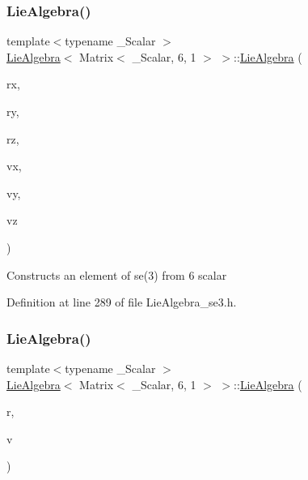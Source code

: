 \subsubsection{\texorpdfstring{Lie\+Algebra()}{LieAlgebra()}\hspace{0.1cm}{\footnotesize\ttfamily [4/5]}}
{\footnotesize\ttfamily template$<$typename \+\_\+\+Scalar $>$ \\
\hyperlink{class_lie_algebra}{Lie\+Algebra}$<$ Matrix$<$ \+\_\+\+Scalar, 6, 1 $>$ $>$\+::\hyperlink{class_lie_algebra}{Lie\+Algebra} (\begin{DoxyParamCaption}\item[{Scalar}]{rx,  }\item[{Scalar}]{ry,  }\item[{Scalar}]{rz,  }\item[{Scalar}]{vx,  }\item[{Scalar}]{vy,  }\item[{Scalar}]{vz }\end{DoxyParamCaption})\hspace{0.3cm}{\ttfamily [inline]}}

Constructs an element of se(3) from 6 scalar 

Definition at line 289 of file Lie\+Algebra\+\_\+se3.\+h.

\hypertarget{class_lie_algebra_3_01_matrix_3_01___scalar_00_016_00_011_01_4_01_4_a9cb95236184bdf617027d9c71fcbf66a}{}\label{class_lie_algebra_3_01_matrix_3_01___scalar_00_016_00_011_01_4_01_4_a9cb95236184bdf617027d9c71fcbf66a} 
\subsubsection{\texorpdfstring{Lie\+Algebra()}{LieAlgebra()}\hspace{0.1cm}{\footnotesize\ttfamily [5/5]}}
{\footnotesize\ttfamily template$<$typename \+\_\+\+Scalar $>$ \\
\hyperlink{class_lie_algebra}{Lie\+Algebra}$<$ Matrix$<$ \+\_\+\+Scalar, 6, 1 $>$ $>$\+::\hyperlink{class_lie_algebra}{Lie\+Algebra} (\begin{DoxyParamCaption}\item[{const typename Base\+::so3\+Element \&}]{r,  }\item[{const typename Base\+::\+Vector3 \&}]{v }\end{DoxyParamCaption})\hspace{0.3cm}{\ttfamily [inline]}}

